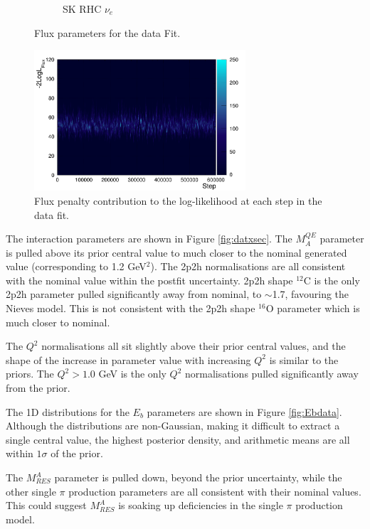 \begin{figure}
\begin{subfigure}{0.24\textwidth}
  \caption{SK RHC $\nu_e$}
  \label{fig:}
\end{subfigure}
\caption{Flux parameters for the data Fit.}
\label{fig:datfluxSK}
\end{figure}

\begin{figure}
\centering
\includegraphics*[width=0.7\textwidth,clip]{figs/llh_fluxdat}
\caption{Flux penalty contribution to the log-likelihood at each step in the data fit.}\label{fig:llh_fluxdat}
\end{figure}

The interaction parameters are shown in Figure \ref{fig:datxsec}. The $M^{QE}_A$ parameter is pulled above its prior central value to much closer to the nominal generated value (corresponding to 1.2 GeV$^2$). The 2p2h normalisations are all consistent with the nominal value within the postfit uncertainty. 2p2h shape $^{12}$C is the only 2p2h parameter pulled significantly away from nominal, to $\sim$1.7, favouring the Nieves model. This is not consistent with the 2p2h shape $^{16}$O parameter which is much closer to nominal.

The $Q^2$ normalisations all sit slightly above their prior central values, and the shape of the increase in parameter value with increasing $Q^2$ is similar to the priors. The $Q^2>1.0$ GeV is the only $Q^2$ normalisations pulled significantly away from the prior.

The 1D distributions for the $E_b$ parameters are shown in Figure \ref{fig:Ebdata}. Although the distributions are non-Gaussian, making it difficult to extract a single central value, the highest posterior density, and arithmetic means are all within $1\sigma$ of the prior.

The $M^A_{RES}$ parameter is pulled down, beyond the prior uncertainty, while the other single $\pi$ production parameters are all consistent with their nominal values. This could suggest $M^A_{RES}$ is soaking up deficiencies in the single $\pi$ production model.

